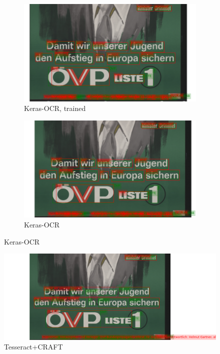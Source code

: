 \begin{figure}[hbtp!]
    \begin{subfigure}{\textwidth}
        \centering
        \includegraphics[scale=0.36]{obrazky/plakaty/result_kerasOCRtrained_vienna1_split-90.png}
        \caption{Keras-OCR, trained}
        \label{Im1:ex:kertr}
    \end{subfigure}

    \begin{subfigure}{\textwidth}
        \centering
        \includegraphics[scale=0.36]{obrazky/plakaty/result_kerasOCR_vienna1_nosplit_nocorrection-90.png}
        \caption{Keras-OCR}
        \label{Im1:ex:ker}
    \end{subfigure}
    
    \caption{Keras-OCR}
    \label{Im1:ex:Keras}
\end{figure}


\begin{figure}[hbtp!]
    \centering
    \includegraphics[scale=0.36]{obrazky/plakaty/result_carfttesseract_vienna1_split_special_snesitive-91.png}
    \caption{Tesseract+CRAFT}
    \label{Im1:ex:craft}
\end{figure}


